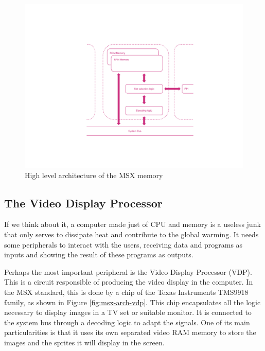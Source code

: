 \begin{figure}
	\centering
	\includegraphics[width=1\linewidth,trim={0cm 100 0 100}]{images/figures/msx-arch-memory}
	\caption{High level architecture of the MSX memory}
	\label{fig:msx-arch-memory}
\end{figure}

\subsection{The Video Display Processor}

If we think about it, a computer made just of CPU and memory is a useless junk that only serves to dissipate heat and contribute to the global warming. It needs some peripherals to interact with the users, receiving data and programs as inputs and showing the result of these programs as outputs. 

Perhaps the most important peripheral is the Video Display Processor (VDP). This is a circuit responsible of producing the video display in the computer. In the MSX standard, this is done by a chip of the Texas Instruments TMS9918 family, as shown in Figure \ref{fig:msx-arch-vdp}. This chip encapsulates all the logic necessary to display images in a TV set or suitable monitor. It is connected to the system bus through a decoding logic to adapt the signals. One of its main particularities is that it uses its own separated video RAM memory to store the images and the sprites it will display in the screen. 

